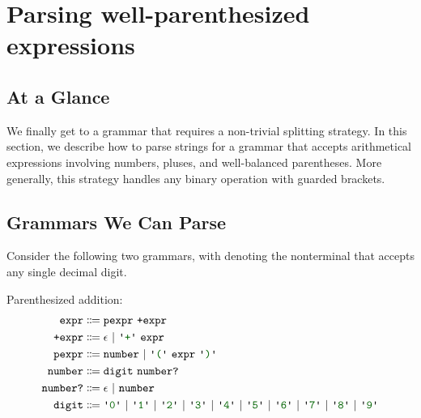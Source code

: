 \newcommand{\nullentry}{\texttt{\ensuremath{\emptyset}}}

\chapter{Parsing well-parenthesized expressions}\label{ch:tables}
%  
\section{At a Glance}
  We finally get to a grammar that requires a non-trivial splitting strategy.  In this section, we describe how to parse strings for a grammar that accepts arithmetical expressions involving numbers, pluses, and well-balanced parentheses.  More generally, this strategy handles any binary operation with guarded brackets.
  
\section{Grammars We Can Parse}
  Consider the following two grammars, with  denoting the nonterminal that accepts any single decimal digit.
  
  Parenthesized addition:
  \begin{align*}
    \nt{expr} & \Coloneqq \nt{pexpr}~\nt{+expr} \\
    \nt{+expr} & \Coloneqq \epsilon~|~\terminal{+}~\nt{expr} \\
    \nt{pexpr} & \Coloneqq \nt{number}~|~\terminal{(}~\nt{expr}~\terminal{)} \\
    \nt{number} & \Coloneqq \nt{digit}~\nt{number?} \\
    \nt{number?} & \Coloneqq \epsilon~|~\nt{number} \\
    \nt{digit} & \Coloneqq \terminal{0}~|~\terminal{1}~|~\terminal{2}~|~\terminal{3}~|~\terminal{4}~|~\terminal{5}~|~\terminal{6}~|~\terminal{7}~|~\terminal{8}~|~\terminal{9}
  \end{align*}
  
